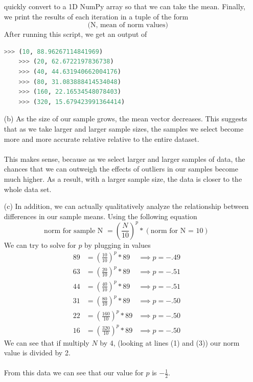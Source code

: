 \documentclass[12pt, letterpaper]{article}
\begin{document}
\begin{enumerate}
    quickly convert to a 1D NumPy array so that we can take the mean. Finally, we print the results of each 
    iteration in a tuple of the form 
    \[
        \text{ (N, mean of norm values)}
    \]  
    After running this script, we get an output of 
\begin{lstlisting}[language=python]
    >>> (10, 88.96267114841969)
    >>> (20, 62.6722197836738)
    >>> (40, 44.631940662004176)
    >>> (80, 31.083888414534048)
    >>> (160, 22.16534548078403)
    >>> (320, 15.679423991364414)
\end{lstlisting}
    \item [(b)] As the size of our sample grows, the mean vector decreases. This suggests that as we 
        take larger and larger sample sizes, the samples we select become more and more accurate relative 
        relative to the entire dataset. \\ \\ 
        This makes sense, because as we select larger and larger samples of data, the chances that we can 
        outweigh the effects of outliers in our samples become much higher. As a result, with a larger sample 
        size, the data is closer to the whole data set. 
    \item [(c)] In addition, we can actually qualitatively analyze the relationship between 
        differences in our sample means. Using the following equation 
        \[
            \text{norm for sample N } = (\frac{N}{10})^p * (\text{norm for N = 10})
        \]  
        We can try to solve for $p$ by plugging in values 
        \begin{align}
            89 &= (\frac{10}{10})^p * 89  &\implies p = -.49\\ 
            63 &= (\frac{20}{10})^p * 89 &\implies p = -.51\\ 
            44 &= (\frac{40}{10})^p * 89 &\implies p = -.51\\ 
            31 &= (\frac{80}{10})^p * 89 &\implies p = -.50\\ 
            22 &= (\frac{160}{10})^p * 89 &\implies p = -.50\\ 
            16 &= (\frac{320}{10})^p * 89 &\implies p = -.50
        \end{align}
        We can see that if multiply $N$ by 4, (looking at lines (1) and (3)) our norm 
        value is divided by 2. \\ \\
        From this data we can see that our value for $p$ is $-\frac{1}{2}$. 
\end{enumerate}
\end{document}
